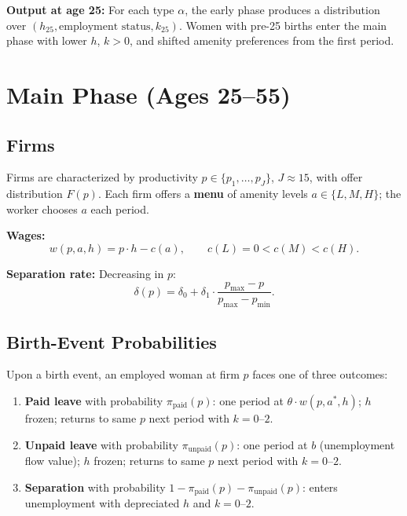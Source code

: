 \documentclass[11pt]{article}
\begin{document}
\noindent\textbf{Output at age 25:} For each type $\alpha$, the early phase produces a distribution over $(h_{25}, \text{employment status}, k_{25})$. Women with pre-25 births enter the main phase with lower $h$, $k > 0$, and shifted amenity preferences from the first period.

\section{Main Phase (Ages 25--55)}

\subsection{Firms}

Firms are characterized by productivity $p \in \{p_1, \ldots, p_J\}$, $J \approx 15$, with offer distribution $F(p)$. Each firm offers a \textbf{menu} of amenity levels $a \in \{L, M, H\}$; the worker chooses $a$ each period.

\medskip\noindent\textbf{Wages:}
\begin{equation}\label{eq:wage}
  w(p, a, h) = p \cdot h - c(a), \qquad c(L) = 0 < c(M) < c(H).
\end{equation}

\noindent\textbf{Separation rate:} Decreasing in $p$:
\begin{equation}\label{eq:delta}
  \delta(p) = \delta_0 + \delta_1 \cdot \frac{p_{\max} - p}{p_{\max} - p_{\min}}.
\end{equation}

\subsection{Birth-Event Probabilities}\label{sec:birth_probs}

Upon a birth event, an employed woman at firm $p$ faces one of three outcomes:

\begin{enumerate}[nosep]
  \item \textbf{Paid leave} with probability $\pi_{\text{paid}}(p)$: one period at $\theta \cdot w(p, a^*, h)$; $h$ frozen; returns to same $p$ next period with $k = 0\text{--}2$.
  \item \textbf{Unpaid leave} with probability $\pi_{\text{unpaid}}(p)$: one period at $b$ (unemployment flow value); $h$ frozen; returns to same $p$ next period with $k = 0\text{--}2$.
  \item \textbf{Separation} with probability $1 - \pi_{\text{paid}}(p) - \pi_{\text{unpaid}}(p)$: enters unemployment with depreciated $h$ and $k = 0\text{--}2$.
\end{enumerate}
\end{document}
